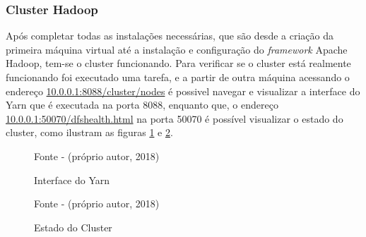 \subsubsection{Cluster Hadoop}

Após completar todas as instalações necessárias, que são desde a criação da primeira máquina virtual até a instalação e configuração do \textit{framework} Apache Hadoop, tem-se o cluster funcionando. Para verificar se o cluster está realmente funcionando foi executado uma tarefa, e a partir de outra máquina acessando o endereço \url{10.0.0.1:8088/cluster/nodes} é possivel navegar e visualizar a interface do Yarn que é executada na porta 8088, enquanto que, o endereço \url{10.0.0.1:50070/dfshealth.html} na porta 50070 é possível visualizar o estado do cluster, como ilustram as figuras \ref{Fig:Interface do Yarn} e \ref{Fig:Estado do Cluster}.

\begin{figure}[htbp!] \begin{center}
	\caption{Interface do Yarn}
	\small{Fonte - (próprio autor, 2018)}
	\label{Fig:Interface do Yarn}
	\end{center} \end{figure}
    
    \begin{figure}[htbp!] \begin{center}
	\caption{Estado do Cluster}
	\small{Fonte - (próprio autor, 2018)}
	\label{Fig:Estado do Cluster}
	\end{center} \end{figure}


